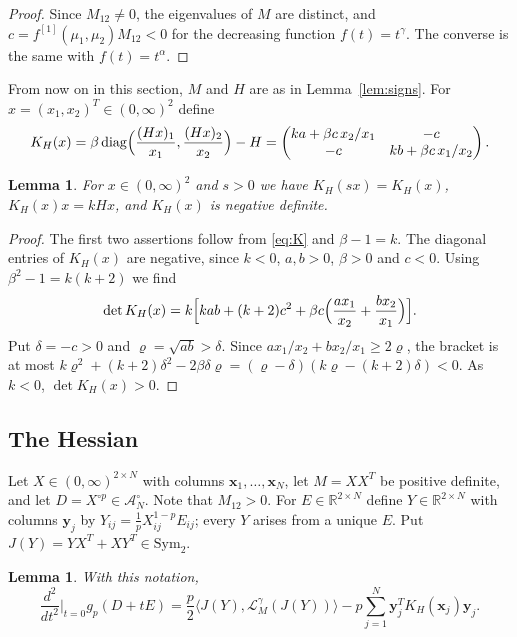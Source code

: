 \documentclass[11pt]{amsart}
\newtheorem{lemma}[theorem]{Lemma}
\theoremstyle{definition}
\theoremstyle{remark}
\numberwithin{equation}{section}
\newcommand{\R}{\mathbb{R}}
\newcommand{\diag}{\operatorname{diag}}
\newcommand{\Sym}{\mathrm{Sym}_2}
\newcommand{\cA}{\mathcal{A}}
\newcommand{\cL}{\mathcal{L}}
\newcommand{\ip}[2]{\langle #1,#2\rangle}
\newcommand{\bx}{\mathbf{x}}
\newcommand{\by}{\mathbf{y}}
\begin{document}
\begin{proof}
Since $M_{12}\ne0$, the eigenvalues of $M$ are distinct, and $c=f^{[1]}(\mu_1,\mu_2)M_{12}<0$ for the decreasing function $f(t)=t^\gamma$. The converse is the same with $f(t)=t^\alpha$.
\end{proof}

From now on in this section, $M$ and $H$ are as in Lemma~\ref{lem:signs}. For $x=(x_1,x_2)^T\in(0,\infty)^2$ define
\begin{equation}\label{eq:K}
K_H(x)=\beta\diag\Bigl(\frac{(Hx)_1}{x_1},\frac{(Hx)_2}{x_2}\Bigr)-H=\begin{pmatrix}ka+\beta c\,x_2/x_1&-c\\ -c&kb+\beta c\,x_1/x_2\end{pmatrix}.
\end{equation}

\begin{lemma}\label{lem:K}
For $x\in(0,\infty)^2$ and $s>0$ we have $K_H(sx)=K_H(x)$, $K_H(x)x=kHx$, and $K_H(x)$ is negative definite.
\end{lemma}

\begin{proof}
The first two assertions follow from \eqref{eq:K} and $\beta-1=k$. The diagonal entries of $K_H(x)$ are negative, since $k<0$, $a,b>0$, $\beta>0$ and $c<0$. Using $\beta^2-1=k(k+2)$ we find
\begin{equation}\label{eq:detK}
\det K_H(x)=k\Bigl[kab+(k+2)c^2+\beta c\Bigl(\frac{ax_1}{x_2}+\frac{bx_2}{x_1}\Bigr)\Bigr].
\end{equation}
Put $\delta=-c>0$ and $\varrho=\sqrt{ab}>\delta$. Since $ax_1/x_2+bx_2/x_1\ge2\varrho$, the bracket is at most $k\varrho^2+(k+2)\delta^2-2\beta\delta\varrho=(\varrho-\delta)(k\varrho-(k+2)\delta)<0$. As $k<0$, $\det K_H(x)>0$.
\end{proof}

\subsection{The Hessian}
Let $X\in(0,\infty)^{2\times N}$ with columns $\bx_1,\dots,\bx_N$, let $M=XX^T$ be positive definite, and let $D=X^{\circ p}\in\cA_N^\circ$. Note that $M_{12}>0$. For $E\in\R^{2\times N}$ define $Y\in\R^{2\times N}$ with columns $\by_j$ by $Y_{ij}=\frac1pX_{ij}^{1-p}E_{ij}$; every $Y$ arises from a unique $E$. Put $J(Y)=YX^T+XY^T\in\Sym$.

\begin{lemma}\label{lem:hessian}
With this notation,
\begin{equation}\label{eq:hessian}
\frac{d^2}{dt^2}\Big|_{t=0}g_p(D+tE)=\frac p2\ip{J(Y)}{\cL^\gamma_M(J(Y))}-p\sum_{j=1}^N\by_j^TK_H(\bx_j)\by_j .
\end{equation}
\end{lemma}
\end{document}
